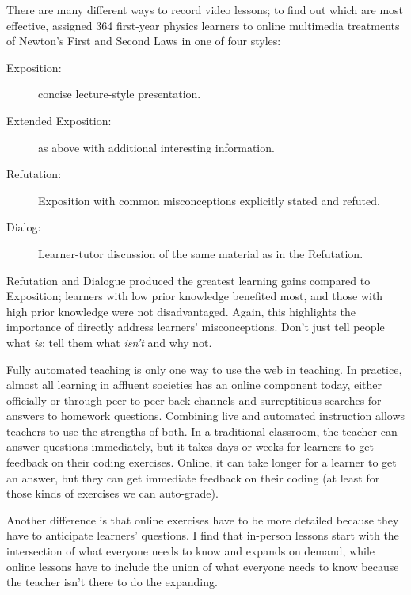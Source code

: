 There are many different ways to record video lessons;
to find out which are most effective,
\cite{Mull2007a} assigned 364 first-year physics learners
to online multimedia treatments of Newton's First and Second Laws in one of four styles:

\begin{description}

\item[Exposition:]
  concise lecture-style presentation.

\item[Extended Exposition:]
  as above with additional interesting information.

\item[Refutation:]
  Exposition with common misconceptions explicitly stated and refuted.

\item[Dialog:]
  Learner-tutor discussion of the same material as in the Refutation.

\end{description}

Refutation and Dialogue produced the greatest learning gains compared to Exposition;
learners with low prior knowledge benefited most,
and those with high prior knowledge were not disadvantaged.
Again,
this highlights the importance of directly address learners' misconceptions.
Don't just tell people what \emph{is}:
tell them what \emph{isn't} and why not.


Fully automated teaching is only one way to use the web in teaching.
In practice,
almost all learning in affluent societies has an online component today,
either officially
or through peer-to-peer back channels and surreptitious searches for answers to homework questions.
Combining live and automated instruction allows teachers to use the strengths of both.
In a traditional classroom,
the teacher can answer questions immediately,
but it takes days or weeks for learners to get feedback on their coding exercises.
Online,
it can take longer for a learner to get an answer,
but they can get immediate feedback on their coding
(at least for those kinds of exercises we can auto-grade).

Another difference is that
online exercises have to be more detailed
because they have to anticipate learners' questions.
I find that in-person lessons start with the intersection of what everyone needs to know and expands on demand,
while online lessons have to include the union of what everyone needs to know
because the teacher isn't there to do the expanding.

